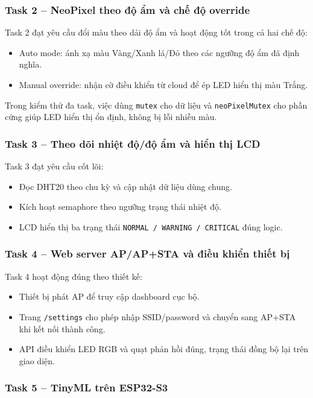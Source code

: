 \subsubsection*{Task 2 -- NeoPixel theo độ ẩm và chế độ override}

Task 2 đạt yêu cầu đổi màu theo dải độ ẩm và hoạt động tốt trong cả hai chế độ:
\begin{itemize}
    \item Auto mode: ánh xạ màu Vàng/Xanh lá/Đỏ theo các ngưỡng độ ẩm đã định nghĩa.
    \item Manual override: nhận cờ điều khiển từ cloud để ép LED hiển thị màu Trắng.
\end{itemize}
Trong kiểm thử đa task, việc dùng \texttt{mutex} cho dữ liệu và \texttt{neoPixelMutex} cho phần cứng giúp LED hiển thị ổn định, không bị lỗi nhiễu màu.

\subsubsection*{Task 3 -- Theo dõi nhiệt độ/độ ẩm và hiển thị LCD}

Task 3 đạt yêu cầu cốt lõi:
\begin{itemize}
    \item Đọc DHT20 theo chu kỳ và cập nhật dữ liệu dùng chung.
    \item Kích hoạt semaphore theo ngưỡng trạng thái nhiệt độ.
    \item LCD hiển thị ba trạng thái \texttt{NORMAL / WARNING / CRITICAL} đúng logic.
\end{itemize}

\subsubsection*{Task 4 -- Web server AP/AP+STA và điều khiển thiết bị}

Task 4 hoạt động đúng theo thiết kế:
\begin{itemize}
    \item Thiết bị phát AP để truy cập dashboard cục bộ.
    \item Trang \texttt{/settings} cho phép nhập SSID/password và chuyển sang AP+STA khi kết nối thành công.
    \item API điều khiển LED RGB và quạt phản hồi đúng, trạng thái đồng bộ lại trên giao diện.
\end{itemize}

\subsubsection*{Task 5 -- TinyML trên ESP32-S3}

